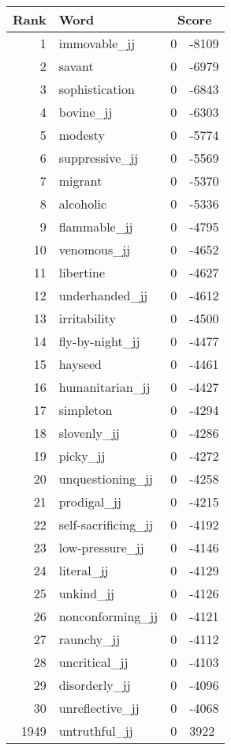 \begin{longtable}[!htbp]{| rlr@{.}l |}
    \hline
    \textbf{Rank} & \textbf{Word} & \multicolumn{2}{c|}{\textbf{Score}} \\
    \hline
    \endhead
    1 & immovable\_jj & 0 & -8109 \\
    2 & savant & 0 & -6979 \\
    3 & sophistication & 0 & -6843 \\
    4 & bovine\_jj & 0 & -6303 \\
    5 & modesty & 0 & -5774 \\
    6 & suppressive\_jj & 0 & -5569 \\
    7 & migrant & 0 & -5370 \\
    8 & alcoholic & 0 & -5336 \\
    9 & flammable\_jj & 0 & -4795 \\
    10 & venomous\_jj & 0 & -4652 \\
    11 & libertine & 0 & -4627 \\
    12 & underhanded\_jj & 0 & -4612 \\
    13 & irritability & 0 & -4500 \\
    14 & fly-by-night\_jj & 0 & -4477 \\
    15 & hayseed & 0 & -4461 \\
    16 & humanitarian\_jj & 0 & -4427 \\
    17 & simpleton & 0 & -4294 \\
    18 & slovenly\_jj & 0 & -4286 \\
    19 & picky\_jj & 0 & -4272 \\
    20 & unquestioning\_jj & 0 & -4258 \\
    21 & prodigal\_jj & 0 & -4215 \\
    22 & self-sacrificing\_jj & 0 & -4192 \\
    23 & low-pressure\_jj & 0 & -4146 \\
    24 & literal\_jj & 0 & -4129 \\
    25 & unkind\_jj & 0 & -4126 \\
    26 & nonconforming\_jj & 0 & -4121 \\
    27 & raunchy\_jj & 0 & -4112 \\
    28 & uncritical\_jj & 0 & -4103 \\
    29 & disorderly\_jj & 0 & -4096 \\
    30 & unreflective\_jj & 0 & -4068 \\
    1949 & untruthful\_jj & 0 & 3922 \\

\end{longtable}

